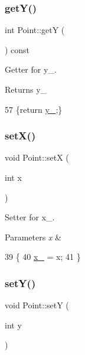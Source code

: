 \subsubsection{\texorpdfstring{get\+Y()}{getY()}}
{\footnotesize\ttfamily int Point\+::getY (\begin{DoxyParamCaption}{ }\end{DoxyParamCaption}) const\hspace{0.3cm}{\ttfamily [inline]}}



Getter for y\+\_\+. 

\begin{DoxyReturn}{Returns}
y\+\_\+ 
\end{DoxyReturn}

\begin{DoxyCode}
57 \{\textcolor{keywordflow}{return} \mbox{\hyperlink{class_point_ae45effa2adb0036e4a770abb9b1160e6}{y\_}};\}
\end{DoxyCode}
\mbox{\label{class_point_acdc86ab607b2ae8415152883e2629015}} 
\subsubsection{\texorpdfstring{set\+X()}{setX()}}
{\footnotesize\ttfamily void Point\+::setX (\begin{DoxyParamCaption}\item[{int}]{x }\end{DoxyParamCaption})}



Setter for x\+\_\+. 


\begin{DoxyParams}{Parameters}
{\em x} & \\
\hline
\end{DoxyParams}

\begin{DoxyCode}
39                       \{
40     \mbox{\hyperlink{class_point_acfe156c55546f7e551fb54c7ea08a6cb}{x\_}} = x;
41 \}
\end{DoxyCode}
\mbox{\label{class_point_afccad787a359f062efc1af5e935a99ba}} 
\subsubsection{\texorpdfstring{set\+Y()}{setY()}}
{\footnotesize\ttfamily void Point\+::setY (\begin{DoxyParamCaption}\item[{int}]{y }\end{DoxyParamCaption})}



